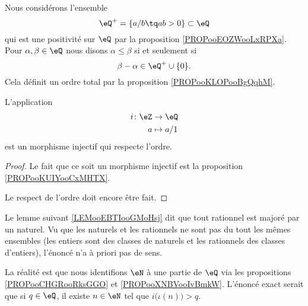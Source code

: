 \begin{propositionDef}      \label{DEFooZEXXooUtOhqB}

	Nous considérons l'ensemble
	\begin{equation}
		\eQ^+=\{ a/b\tq ab>0 \}\subset \eQ
	\end{equation}
	qui est une positivité sur \( \eQ\) par la proposition \ref{PROPooEOZWooLxRPXa}. Pour \( \alpha,\beta\in \eQ\) nous disons \( \alpha\leq \beta\) si et seulement si
	\begin{equation}
		\beta-\alpha\in \eQ^+\cup\{ 0 \}.
	\end{equation}
	Cela définit un ordre total par la proposition \ref{PROPooKLOPooBgQqhM}.
\end{propositionDef}

\begin{proposition}	\label{PROPooXNBVooIvBmkW}
	L'application
	\begin{equation}
		\begin{aligned}
			i\colon \eZ & \to \eQ     \\
			a           & \mapsto a/1
		\end{aligned}
	\end{equation}
	est un morphisme injectif qui respecte l'ordre.
\end{proposition}

\begin{proof}
	Le fait que ce soit un morphisme injectif est la proposition \ref{PROPooKUIYooCxMHTX}.

	Le respect de l'ordre doit encore être fait.
\end{proof}

\begin{normaltext}
	Le lemme suivant \ref{LEMooEBTIooGMoHsj} dit que tout rationnel est majoré par un naturel. Vu que les naturels et les rationnels ne sont pas du tout les mêmes ensembles (les entiers sont des classes de naturels et les rationnels des classes d'entiers), l'énoncé n'a à priori pas de sens.

	La réalité est que nous identifions \( \eN\) à une partie de \( \eQ\) via les propositions \ref{PROPooCHGRooRksGGO} et \ref{PROPooXNBVooIvBmkW}. L'énoncé exact serait que si \( q\in \eQ\), il existe \( n\in \eN\) tel que \( i\big( \iota(n) \big)> q\).
\end{normaltext}

